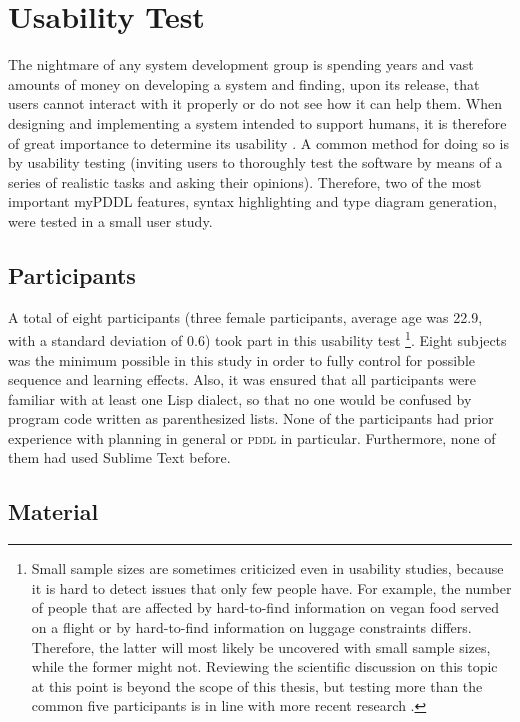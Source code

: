 \documentclass[a4paper,12pt]{report}
\newcommand{\mypddl}{\smallerft[0.8]{myPDDL}\xspace}
\newcommand{\pddl}{\textsc{pddl}\xspace}
\newcommand\smallerft[2][0.85]{{\scalefont{#1}#2}}
\begin{document}
\section{Usability Test}
\label{sec-5-2}

The nightmare of any system development group is spending years and
vast amounts of money on developing a system and finding, upon its
release, that users cannot interact with it properly or do not see how
it can help them. When designing and implementing a system intended to
support humans, it is therefore of great importance to determine its
usability \cite{johnson2000gui}. A common method for doing so is by
usability testing (inviting users to thoroughly test the software by
means of a series of realistic tasks and asking their opinions).
Therefore, two of the most important \mypddl features, syntax
highlighting and type diagram generation, were tested in a small user
study.

\subsection{Participants}
\label{sec-5-2-1}

A total of eight participants (three female participants, average age
was 22.9, with a standard deviation of 0.6) took part in this
usability test \footnote{Small sample sizes are sometimes criticized even in usability
studies, because it is hard to detect issues that only few people
have. For example, the number of people that are affected by
hard-to-find information on vegan food served on a flight or by
hard-to-find information on luggage constraints differs. Therefore,
the latter will most likely be uncovered with small sample sizes,
while the former might not. Reviewing the scientific discussion on
this topic at this point is beyond the scope of this thesis, but
testing more than the common five participants
\cite{nielsen1994estimating,nielsen1990heuristic,virzi1992refining} is
in line with more recent research
\cite{faulkner2003beyond,hwang2010number}.}. Eight subjects was the minimum possible in
this study in order to fully control for possible sequence and
learning effects. Also, it was ensured that all participants were
familiar with at least one Lisp dialect, so that no one would be
confused by program code written as parenthesized lists. None of the
participants had prior experience with planning in general or \pddl in
particular. Furthermore, none of them had used Sublime Text before.
\subsection{Material}
\label{sec-5-2-2}
\end{document}

